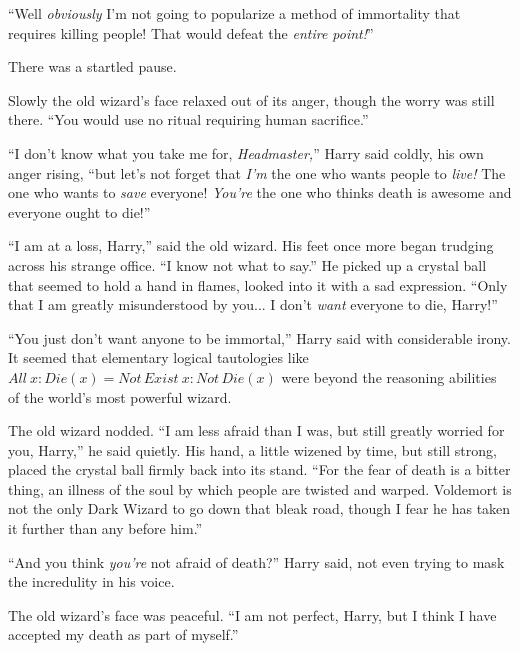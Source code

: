 “Well \emph{obviously} I’m not going to popularize a method of immortality that requires killing people! That would defeat the \emph{entire point!}”

There was a startled pause.

Slowly the old wizard’s face relaxed out of its anger, though the worry was still there. “You would use no ritual requiring human sacrifice.”

“I don’t know what you take me for, \emph{Headmaster,}” Harry said coldly, his own anger rising, “but let’s not forget that \emph{I’m} the one who wants people to \emph{live!} The one who wants to \emph{save} everyone! \emph{You’re} the one who thinks death is awesome and everyone ought to die!”

“I am at a loss, Harry,” said the old wizard. His feet once more began trudging across his strange office. “I know not what to say.” He picked up a crystal ball that seemed to hold a hand in flames, looked into it with a sad expression. “Only that I am greatly misunderstood by you... I don’t \emph{want} everyone to die, Harry!”

“You just don’t want anyone to be immortal,” Harry said with considerable irony. It seemed that elementary logical tautologies like $All\ x: Die(x) = Not\,Exist\ x: Not\,Die(x)$ were beyond the reasoning abilities of the world’s most powerful wizard.

The old wizard nodded. “I am less afraid than I was, but still greatly worried for you, Harry,” he said quietly. His hand, a little wizened by time, but still strong, placed the crystal ball firmly back into its stand. “For the fear of death is a bitter thing, an illness of the soul by which people are twisted and warped. Voldemort is not the only Dark Wizard to go down that bleak road, though I fear he has taken it further than any before him.”

“And you think \emph{you’re} not afraid of death?” Harry said, not even trying to mask the incredulity in his voice.

The old wizard’s face was peaceful. “I am not perfect, Harry, but I think I have accepted my death as part of myself.”

